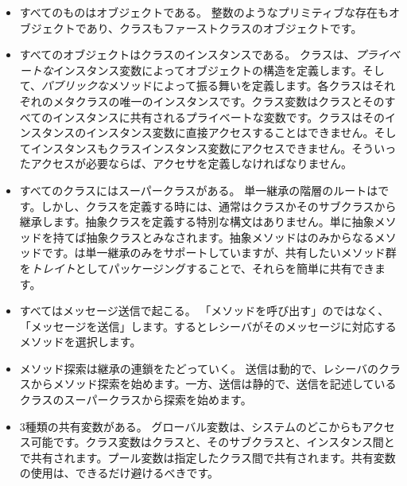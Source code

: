 \documentclass[a4paper,10pt,twoside]{book}
\begin{document}
\begin{itemize}
  \item すべてのものはオブジェクトである。
  整数のようなプリミティブな存在もオブジェクトであり、クラスもファーストクラスのオブジェクトです。

  \item すべてのオブジェクトはクラスのインスタンスである。
  クラスは、\emph{プライベートな}インスタンス変数によってオブジェクトの構造を定義します。そして、\emph{パブリックな}メソッドによって振る舞いを定義します。各クラスはそれぞれのメタクラスの唯一のインスタンスです。クラス変数はクラスとそのすべてのインスタンスに共有されるプライベートな変数です。クラスはそのインスタンスのインスタンス変数に直接アクセスすることはできません。そしてインスタンスもクラスインスタンス変数にアクセスできません。そういったアクセスが必要ならば、アクセサを定義しなければなりません。

  \item すべてのクラスにはスーパークラスがある。
  単一継承の階層のルートはです。しかし、クラスを定義する時には、通常はクラスかそのサブクラスから継承します。抽象クラスを定義する特別な構文はありません。単に抽象メソッドを持てば抽象クラスとみなされます。抽象メソッドはのみからなるメソッドです。\pharo は単一継承のみをサポートしていますが、共有したいメソッド群を\emph{トレイト}としてパッケージングすることで、それらを簡単に共有できます。

  \item すべてはメッセージ送信で起こる。
	「メソッドを呼び出す」のではなく、「メッセージを送信」します。するとレシーバがそのメッセージに対応するメソッドを選択します。

  \item メソッド探索は継承の連鎖をたどっていく。
  \self 送信は動的で、レシーバのクラスからメソッド探索を始めます。一方、\super 送信は静的で、\super 送信を記述しているクラスのスーパークラスから探索を始めます。
  
  \item 3種類の共有変数がある。
	グローバル変数は、システムのどこからもアクセス可能です。クラス変数はクラスと、そのサブクラスと、インスタンス間とで共有されます。プール変数は指定したクラス間で共有されます。共有変数の使用は、できるだけ避けるべきです。

\end{itemize}

\ifx\wholebook\relax\else
   
   
\end{document}
